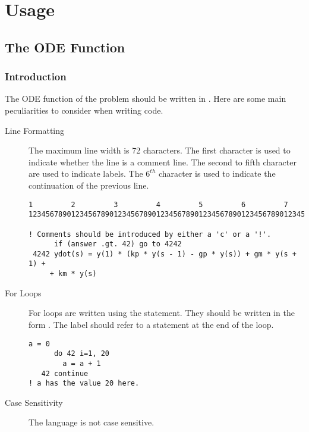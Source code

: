 \chapter[Usage]{Usage}
\section[ODE Function]{The ODE Function}
\subsection{Introduction}
The ODE function of the problem should be written in . Here are some main \Fortran peculiarities to consider when writing \Fortran code.
\begin{description}
 \item[Line Formatting] The maximum line width is 72 characters. The first character is used to indicate whether the line is a comment line. The second to fifth character are used to indicate labels. The $6^{th}$ character is used to indicate the continuation of the previous line.
 \begin{lstlisting}[style=fortrancode,caption=Syntax Example]
          1         2         3         4         5         6         7
123456789012345678901234567890123456789012345678901234567890123456789012

! Comments should be introduced by either a 'c' or a '!'.
      if (answer .gt. 42) go to 4242
 4242 ydot(s) = y(1) * (kp * y(s - 1) - gp * y(s)) + gm * y(s + 1) +
     + km * y(s)
 \end{lstlisting}
 \item[For Loops] For loops are written using the  statement. They should be written in the form . The label should refer to a  statement at the end of the loop.
  \begin{lstlisting}[style=fortrancode,caption=Do-Loop]
      a = 0
      do 42 i=1, 20
        a = a + 1
   42 continue
! a has the value 20 here.
 \end{lstlisting}
 \item[Case Sensitivity] The \Fortran language is not case sensitive.
\end{description}

